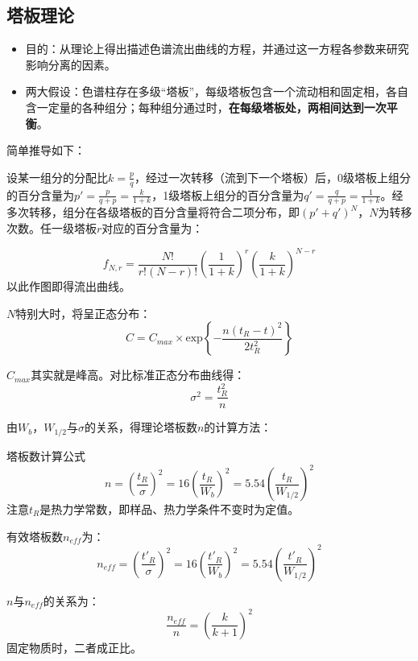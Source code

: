 \subsection{塔板理论}
\begin{itemize}
	\item 目的：从理论上得出描述色谱流出曲线的方程，并通过这一方程各参数来研究影响分离的因素。
	\item 两大假设：色谱柱存在多级“塔板”，每级塔板包含一个流动相和固定相，各自含一定量的各种组分；每种组分通过时，\textbf{在每级塔板处，两相间达到一次平衡}。
\end{itemize}

简单推导如下：

设某一组分的分配比$k=\frac{p}{q}$，经过一次转移（流到下一个塔板）后，0级塔板上组分的百分含量为$p'=\frac{p}{q+p}=\frac{k}{1+k}$，1级塔板上组分的百分含量为$q'=\frac{q}{q+p}=\frac{1}{1+k}$。经多次转移，组分在各级塔板的百分含量将符合二项分布，即${(p'+q')^N}$，$N$为转移次数。任一级塔板$r$对应的百分含量为：

\begin{equation*}
	f_{N,r}=\dfrac{N!}{r!(N-r)!} \left(\dfrac{1}{1+k}\right)^r \left(\dfrac{k}{1+k}\right)^{N-r}
\end{equation*}
以此作图即得流出曲线。

$N$特别大时，将呈正态分布：
\begin{equation*}
	C=C_{max}\times \mathrm{exp}\left\{-\dfrac{n(t_R-t)^2}{2t_R^2}\right\}
\end{equation*}

$C_{max}$其实就是峰高。对比标准正态分布曲线得：
\begin{equation*}
	{\sigma}^2=\dfrac{t_R^2}{n}
\end{equation*}

由$W_b$，$W_{1/2}$与$\sigma$的关系，得理论塔板数$n$的计算方法：

\begin{theorem*}{塔板数计算公式}{}
	\begin{equation}
		n={\left(\dfrac{t_R}{\sigma}\right)}^2=16{\left(\dfrac{t_R}{W_b}\right)}^2=5.54{\left(\dfrac{t_R}{W_{1/2}}\right)}^2\label{eqn:1.2}
	\end{equation}
	注意$t_R$是热力学常数，即样品、热力学条件不变时为定值。
	
	有效塔板数$n_{eff}$为：
	\begin{equation*}
		n_{eff}={\left(\dfrac{t'_R}{\sigma}\right)}^2=16{\left(\dfrac{t'_R}{W_b}\right)}^2=5.54{\left(\dfrac{t'_R}{W_{1/2}}\right)}^2
	\end{equation*}
	
	$n$与$n_{eff}$的关系为：
	\begin{equation}
		\dfrac{n_{eff}}{n}={\left(\dfrac{k}{k+1}\right)}^2
	\end{equation}
	固定物质时，二者成正比。
\end{theorem*}

